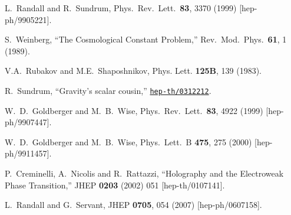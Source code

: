 \documentclass[12pt]{article}
\newcommand{\arXivold}[1]{\href{http://arxiv.org/pdf/#1}{{\tt #1}}}
\begin{document}
\newpage

\begin{thebibliography}{99}



  L.~Randall and R.~Sundrum,
  Phys.\ Rev.\ Lett.\  {\bf 83}, 3370 (1999)
  [hep-ph/9905221].
  

S.~Weinberg,
  ``The Cosmological Constant Problem,''
  Rev.\ Mod.\ Phys.\  {\bf 61}, 1 (1989).

V.A.~Rubakov and M.E.~Shaposhnikov,
Phys. Lett. {\bf 125B}, 139 (1983).

  R.~Sundrum,
  ``Gravity's scalar cousin,''
  \arXivold{hep-th/0312212}.


  W.~D.~Goldberger and M.~B.~Wise,
  Phys.\ Rev.\ Lett.\  {\bf 83}, 4922 (1999)
  [hep-ph/9907447].
  
  W.~D.~Goldberger and M.~B.~Wise,
  Phys.\ Lett.\ B {\bf 475}, 275 (2000)
  [hep-ph/9911457].
  
  
P.~Creminelli, A.~Nicolis and R.~Rattazzi,
``Holography and the Electroweak Phase Transition,''
JHEP {\bf 0203} (2002) 051
[hep-th/0107141].
  
  L.~Randall and G.~Servant,
  JHEP {\bf 0705}, 054 (2007)
  [hep-ph/0607158].
  

\end{thebibliography}
\end{document}
